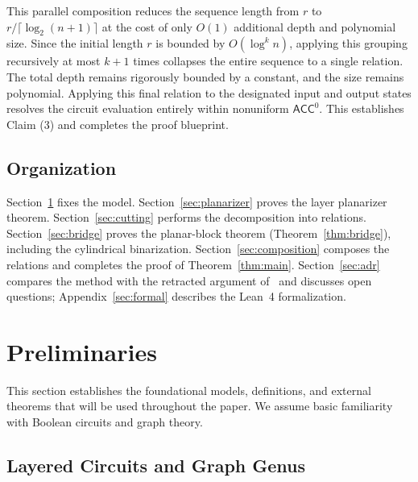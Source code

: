 \documentclass[11pt]{article}
\theoremstyle{definition}
\theoremstyle{remark}
\newcommand{\ACC}{\mathsf{ACC}^0}
\begin{document}
This parallel composition reduces the sequence length from $r$ to $r / \lceil\log_2(n+1)\rceil$ at the cost of only $O(1)$ additional depth and polynomial size. Since the initial length $r$ is bounded by $O(\log^k n)$, applying this grouping recursively at most $k+1$ times collapses the entire sequence to a single relation. The total depth remains rigorously bounded by a constant, and the size remains polynomial. Applying this final relation to the designated input and output states resolves the circuit evaluation entirely within nonuniform $\ACC$. This establishes Claim (3) and completes the proof blueprint.

\subsection{Organization}

Section~\ref{sec:prelim} fixes the model. Section~\ref{sec:planarizer} proves the
layer planarizer theorem. Section~\ref{sec:cutting} performs the decomposition into
relations. Section~\ref{sec:bridge} proves the planar-block theorem
(Theorem~\ref{thm:bridge}), including the cylindrical binarization.
Section~\ref{sec:composition} composes the relations and completes the proof of
Theorem~\ref{thm:main}. Section~\ref{sec:adr} compares the method with the
retracted argument of~\cite{ADR05} and discusses open questions; Appendix~\ref{sec:formal}
describes the Lean~4 formalization.

\section{Preliminaries}\label{sec:prelim}

This section establishes the foundational models, definitions, and external theorems that will be used throughout the paper. We assume basic familiarity with Boolean circuits and graph theory.

\subsection{Layered Circuits and Graph Genus}\label{sec:model}
\end{document}
